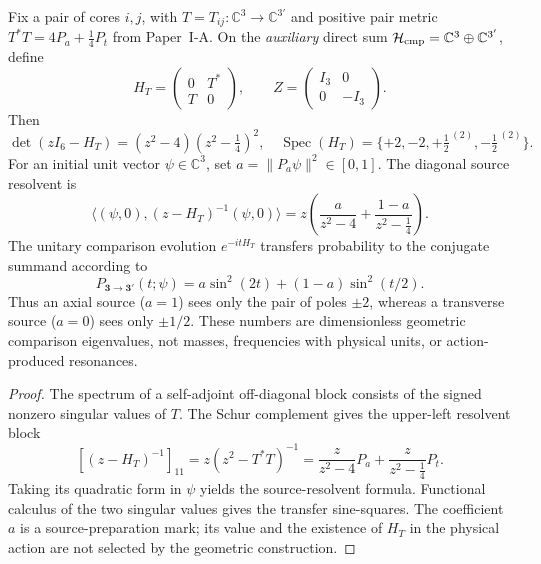 \documentclass[12pt,a4paper]{article}
\begin{document}
\begin{theorem}
\label{p4b:thm:v320-chiral-auxiliary-poles}
Fix a pair of cores $i,j$, with $T=T_{ij}:\mathbb C^3\to\mathbb C^{3'}$
and positive pair metric $T^*T=4P_a+\frac14P_t$ from
Paper~I-A. On the \emph{auxiliary} direct sum
$\mathcal H_{\rm cmp}=\mathbb C^3\oplus\mathbb C^{3'}$, define
\[
 H_T=\begin{pmatrix}0&T^*\\T&0\end{pmatrix},
 \qquad Z=\begin{pmatrix}I_3&0\\0&-I_3\end{pmatrix}.
\]
Then
\[
 \det(zI_6-H_T)=(z^2-4)(z^2-\tfrac14)^2,
 \quad \operatorname{Spec}(H_T)
 =\{+2,-2,+\tfrac12^{\,(2)},-\tfrac12^{\,(2)}\}.
\]
For an initial unit vector $\psi\in\mathbb C^3$, set
$a=\|P_a\psi\|^2\in[0,1]$. The diagonal source resolvent is
\[
 \boxed{\langle(\psi,0),(z-H_T)^{-1}(\psi,0)\rangle
 =z\left(\frac{a}{z^2-4}
 +\frac{1-a}{z^2-\tfrac14}\right).}
\]
The unitary comparison evolution $e^{-itH_T}$ transfers probability
to the conjugate summand according to
\[
 \boxed{P_{\mathbf3\to\mathbf3'}(t;\psi)
 =a\sin^2(2t)+(1-a)\sin^2(t/2).}
\]
Thus an axial source ($a=1$) sees only the pair of poles $\pm2$,
whereas a transverse source ($a=0$) sees only $\pm1/2$. These
numbers are dimensionless geometric comparison eigenvalues, not masses,
frequencies with physical units, or action-produced resonances.
\end{theorem}
\begin{proof}
The spectrum of a self-adjoint off-diagonal block consists of the
signed nonzero singular values of $T$. The Schur complement gives the
upper-left resolvent block
\[
 [(z-H_T)^{-1}]_{11}
 =z(z^2-T^*T)^{-1}
 =\frac{z}{z^2-4}P_a+\frac{z}{z^2-\tfrac14}P_t.
\]
Taking its quadratic form in $\psi$ yields the source-resolvent
formula. Functional calculus of the two singular values gives the
transfer sine-squares. The coefficient $a$ is a source-preparation
mark; its value and the existence of $H_T$ in the physical action
are not selected by the geometric construction.
\end{proof}
\end{document}
